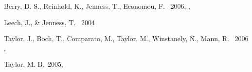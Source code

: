 \documentclass[11pt,twoside]{article}  %
\begin{document}
%
%
%
\begin{references}
 Berry, D. S., Reinhold, K., Jenness, T., Economou, F. 
           \ 2006, \adassxvi, 

 Leech, J., \& Jenness, T. \ 2004 \adassxiv

 Taylor, J., Boch, T., Comparato, M., Taylor, M., 
           Winstanely, N., Mann, R. \ 2006 \adassxvi, 

 Taylor, M. B.\ 2005, \adassxiv

\end{references}

\end{document}
